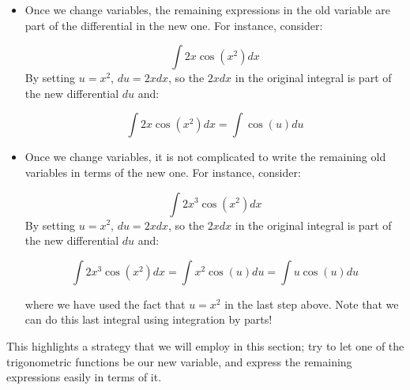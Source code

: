 \documentclass{ximera}
\begin{document}
\begin{itemize}
\item Once we change variables, the remaining expressions in the old variable are part of the differential in the new one.  For instance, consider:

\[ \int 2x \cos\left(x^2\right) dx\]
By setting $u=x^2$, $du = 2x dx$, so the $2x dx$ in the original integral is part of the new differential $du$ and:

\[ \int 2x \cos\left(x^2\right) dx = \int \cos(u) du \]

\item Once we change variables, it is not complicated to write the remaining old variables in terms of the new one.
For instance, consider:

\[ \int 2x^3 \cos\left(x^2\right) dx\]
By setting $u=x^2$, $du = 2x dx$, so the $2x dx$ in the original integral is part of the new differential $du$ and:

\[ \int 2x^3 \cos\left(x^2\right) dx = \int x^2 \cos(u) du  = \int u \cos(u) du \]

where we have used the fact that $u=x^2$ in the last step above.  Note that we can do this last integral using integration by parts!
\end{itemize}

This highlights a strategy that we will employ in this section; try to let one of the trigonometric functions be our new variable, and express the remaining expressions easily in terms of it.
\end{document}
